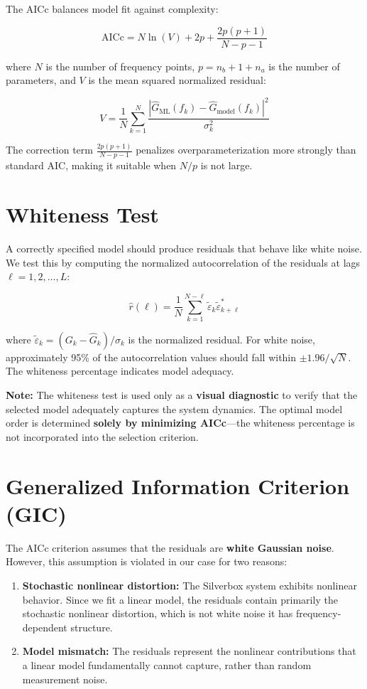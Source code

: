 The AICc balances model fit against complexity:

\begin{equation}
    \text{AICc} = N \ln(V) + 2p + \frac{2p(p+1)}{N-p-1}
\end{equation}

where $N$ is the number of frequency points, $p = n_b + 1 + n_a$ is the number of parameters, and $V$ is the mean squared normalized residual:

\begin{equation}
    V = \frac{1}{N} \sum_{k=1}^{N} \frac{\left| \hat{G}_{\text{ML}}(f_k) - \hat{G}_{\text{model}}(f_k) \right|^2}{\sigma_k^2}
\end{equation}

The correction term $\frac{2p(p+1)}{N-p-1}$ penalizes overparameterization more strongly than standard AIC, making it suitable when $N/p$ is not large.

\section{Whiteness Test}

A correctly specified model should produce residuals that behave like white noise. We test this by computing the normalized autocorrelation of the residuals at lags $\ell = 1, 2, \ldots, L$:

\begin{equation}
    \hat{r}(\ell) = \frac{1}{N} \sum_{k=1}^{N-\ell} \tilde{\varepsilon}_k \tilde{\varepsilon}_{k+\ell}^*
\end{equation}

where $\tilde{\varepsilon}_k = (G_k - \hat{G}_k)/\sigma_k$ is the normalized residual. For white noise, approximately 95\% of the autocorrelation values should fall within $\pm 1.96/\sqrt{N}$. The whiteness percentage indicates model adequacy.

\textbf{Note:} The whiteness test is used only as a \textbf{visual diagnostic} to verify that the selected model adequately captures the system dynamics. The optimal model order is determined \textbf{solely by minimizing AICc}---the whiteness percentage is not incorporated into the selection criterion.

\section{Generalized Information Criterion (GIC)}

The AICc criterion assumes that the residuals are \textbf{white Gaussian noise}. However, this assumption is violated in our case for two reasons:
\begin{enumerate}
    \item \textbf{Stochastic nonlinear distortion:} The Silverbox system exhibits nonlinear behavior. Since we fit a linear model, the residuals contain primarily the stochastic nonlinear distortion, which is not white noise it has frequency-dependent structure.
    \item \textbf{Model mismatch:} The residuals represent the nonlinear contributions that a linear model fundamentally cannot capture, rather than random measurement noise.
\end{enumerate}

